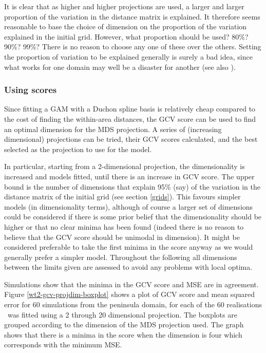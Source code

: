 It is clear that as higher and higher projections are used, a larger and larger proportion of the variation in the distance matrix is explained. It therefore seems reasonable to base the choice of dimension on the proportion of the variation explained in the initial grid. However, what proportion should be used? 80\%? 90\%? 99\%? There is no reason to choose any one of these over the others. Setting the proportion of variation to be explained generally is surely a bad idea, since what works for one domain may well be a disaster for another (see also ).

\subsubsection{Using scores}

Since fitting a GAM with a Duchon spline basis is relatively cheap compared to the cost of finding the within-area distances, the GCV score can be used to find an optimal dimension for the MDS projection. A series of (increasing dimensional) projections can be tried, their GCV scores calculated, and the best selected as the projection to use for the model.

In particular, starting from a 2-dimensional projection, the dimensionality is increased and models fitted, until there is an increase in GCV score. The upper bound is the number of dimensions that explain 95\% (say) of the variation in the distance matrix of the initial grid (see section \ref{grids}).  This favours simpler models (in dimensionality terms), although of course a larger set of dimensions could be considered if there is some prior belief that the dimensionality should be higher or that no clear minima has been found (indeed there is no reason to believe that the GCV score should be unimodal in dimension). It might be considered preferable to take the first minima in the score anyway as we would generally prefer a simpler model. Throughout the following all dimensions between the limits given are assessed to avoid any problems with local optima.

Simulations show that the minima in the GCV score and MSE are in agreement. Figure \ref{wt2-gcv-projdim-boxplot} shows a plot of GCV score and mean squared error for 60 simulations from the peninsula domain, for each of the 60 realisations \mdsds\ was fitted using a 2 through 20 dimensional projection. The boxplots are grouped according to the dimension of the MDS projection used. The graph shows that there is a minima in the score when the dimension is four which corresponds with the minimum MSE.

